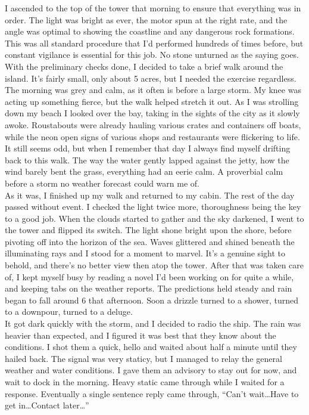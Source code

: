 \documentclass[a5paper]{scrartcl}
\begin{document}
I ascended to the top of the tower that morning to ensure that everything was in order. The light was bright as ever, the motor spun at the right rate, and the angle was optimal to showing the coastline and any dangerous rock formations. This was all standard procedure that I'd performed hundreds of times before, but constant vigilance is essential for this job. No stone unturned as the saying goes.\\


With the preliminary checks done, I decided to take a brief walk around the island. It's fairly small, only about 5 acres, but I needed the exercise regardless. The morning was grey and calm, as it often is before a large storm. My knee was acting up something fierce, but the walk helped stretch it out. As I was strolling down my beach I looked over the bay, taking in the sights of the city as it slowly awoke. Roustabouts were already hauling various crates and containers off boats, while the neon open signs of various shops and restaurants were flickering to life. It still seems odd, but when I remember that day I always find myself drifting back to this walk. The way the water gently lapped against the jetty, how the wind barely bent the grass, everything had an eerie calm. A proverbial calm before a storm no weather forecast could warn me of.\\


As it was, I finished up my walk and returned to my cabin. The rest of the day passed without event. I checked the light twice more, thoroughness being the key to a good job. When the clouds started to gather and the sky darkened, I went to the tower and flipped its switch. The light shone bright upon the shore, before pivoting off into the horizon of the sea. Waves glittered and shined beneath the illuminating rays and I stood for a moment to marvel. It's a genuine sight to behold, and there's no better view then atop the tower. After that was taken care of, I kept myself busy by reading a novel I'd been working on for quite a while, and keeping tabs on the weather reports. The predictions held steady and rain began to fall around 6 that afternoon. Soon a drizzle turned to a shower, turned to a downpour, turned to a deluge.\\


It got dark quickly with the storm, and I decided to radio the ship. The rain was heavier than expected, and I figured it was best that they know about the conditions. I shot them a quick, hello and waited about half a minute until they hailed back. The signal was very staticy, but I managed to relay the general weather and water conditions. I gave them an advisory to stay out for now, and wait to dock in the morning. Heavy static came through while I waited for a response. Eventually a single sentence reply came through, \enquote{Can't wait\dots  Have to get in\dots  Contact later\dots }\\
\end{document}
